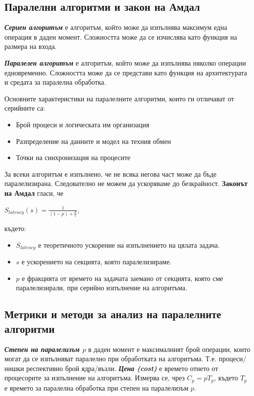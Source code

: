 \documentclass[fleqn,12pt]{article}
\begin{document}
\subsection{Паралелни алгоритми и закон на Амдал}

\textbf{\textit{Сериен алгоритъм}} е алгоритъм, който може да изпълнява максимум една операция в даден момент.
Сложността може да се изчислява като функция на размера на входа.
\bigbreak

\textbf{\textit{Паралелен алгоритъм}} е алгоритъм, който може да изпълнява няколко операции едновременно.
Сложността може да се представи като функция на архитектурата и средата за паралелна обработка.

\bigbreak
Основните характеристики на паралелните алгоритми, които ги отличават от серийните са:
\begin{itemize}
    \item Брой процеси и логическата им организация
    \item Разпределение на данните и модел на техния обмен
    \item Точки на синхронизация на процесите
\end{itemize}
\bigbreak

За всеки алгоритъм е изпълнено, че не всяка негова част може да бъде паралелизирана.
Следователно не можем да ускоряваме до безкрайност.
\textbf{Законът на Амдал} гласи, че 
\begin{center}$S_{latency}(s) = \frac{1}{(1-p) + \frac{p}{s}}$, \end{center}
където:
\begin{itemize}
    \item $S_{latency}$ е теоретичното ускорение на изпълнението на цялата задача.
    \item $s$ е ускорението на секцията, която паралелизираме.
    \item $p$ е фракцията от времето на задачата заемано от секцията, която сме паралелизирали, при серийно изпълнение на алгоритъма.
\end{itemize}

\subsection{Метрики и методи за анализ на паралелните алгоритми}

\textbf{\textit{Степен на паралелизъм $p$}} в даден момент е максималният брой операции, които могат да се изпълняват паралелно при обработката на алгоритъма.
Т.е. процеси/нишки респективно брой ядра/възли.
\bigbreak
\textbf{\textit{Цена (cost)}} е времето отнето от процесорите за изпълнение на алгоритъма. Измерва се, чрез $C_p = pT_p$, където $T_p$ е времето за паралелна обработка при степен на паралелизъм $p$.
\bigbreak
\end{document}
